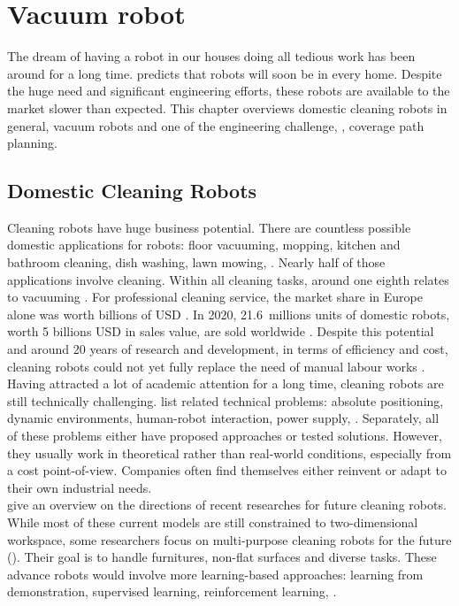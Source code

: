 \chapter{Vacuum robot}

The dream of having a robot in our houses doing all tedious work has been around for a long time.  predicts that robots will soon be in every home. Despite the huge need and significant engineering efforts, these robots are available to the market slower than expected. This chapter overviews domestic cleaning robots in general, vacuum robots and one of the engineering challenge, \ie, coverage path planning.

\section{Domestic Cleaning Robots}
\label{sec:cleaning_robots}

Cleaning robots have huge business potential. There are countless possible domestic applications for robots: floor vacuuming, mopping, kitchen and bathroom cleaning, dish washing, lawn mowing, \etc. Nearly half of those applications involve cleaning. Within all cleaning tasks, around one eighth relates to vacuuming \cite{cakmak2013hri}. For professional cleaning service, the market share in Europe alone was worth billions of USD \cite{schofield1995}. In 2020, 21.6~millions units of domestic robots, worth 5 billions USD in sales value, are sold worldwide \cite{ifr}. Despite this potential and around 20 years of research and development, in terms of efficiency and cost, cleaning robots could not yet fully replace the need of manual labour works \cite{siciliano2016}.\\

Having attracted a lot of academic attention for a long time, cleaning robots are still technically challenging.  list related technical problems: absolute positioning, dynamic environments, human-robot interaction, power supply, \etc. Separately, all of these problems either have proposed approaches or tested solutions. However, they usually work in theoretical rather than real-world conditions, especially from a cost point-of-view. Companies often find themselves either reinvent or adapt to their own industrial needs. \cite{prassler2016}\\

 give an overview on the directions of recent researches for future cleaning robots. While most of these current models are still constrained to two-dimensional workspace, some researchers focus on multi-purpose cleaning robots for the future (). Their goal is to handle furnitures, non-flat surfaces and diverse tasks. These advance robots would involve more learning-based approaches: learning from demonstration, supervised learning, reinforcement learning, \etc. \cite{kim2019ijars}

